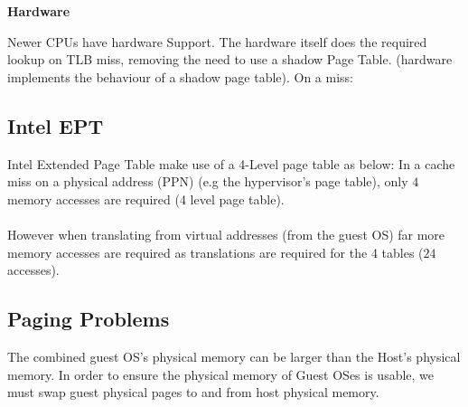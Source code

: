 \documentclass{report}
\begin{document}
\begin{minipage}[t]{0.45\textwidth}
	\centerline{\textbf{Hardware}}
	Newer CPUs have hardware Support. The hardware itself does the
	required lookup on TLB miss, removing the need to use a shadow
	Page Table. (hardware implements the behaviour of a shadow page table).
	On a  miss:
\end{minipage}

\subsection*{Intel EPT}
Intel Extended Page Table make use of a 4-Level page table as below:
In a  cache miss on a physical address (PPN) (e.g the hypervisor's page table), only $4$ memory accesses are required (4 level page table).
\\
\\ However when translating from virtual addresses (from the guest OS) far more memory accesses are required as translations are required for the 4 tables ($24$ accesses).
\subsection*{Paging Problems}
The combined guest OS's physical memory can be larger than the Host's physical memory. In order to ensure the physical memory of Guest OSes is usable, we must swap guest physical pages to and from host physical memory.
\end{document}
